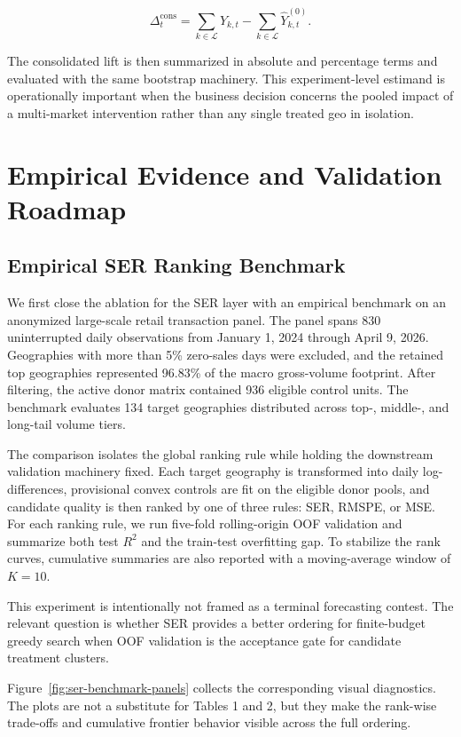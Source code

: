 \documentclass[11pt]{article}
\begin{document}
\[
\Delta_t^{\mathrm{cons}} = \sum_{k \in \mathcal{L}} Y_{k,t} - \sum_{k \in \mathcal{L}} \hat{Y}_{k,t}^{(0)}.
\]

The consolidated lift is then summarized in absolute and percentage terms and evaluated with the same bootstrap machinery. This experiment-level estimand is operationally important when the business decision concerns the pooled impact of a multi-market intervention rather than any single treated geo in isolation.

\section{Empirical Evidence and Validation Roadmap}
\subsection{Empirical SER Ranking Benchmark}
We first close the ablation for the SER layer with an empirical benchmark on an anonymized large-scale retail transaction panel. The panel spans 830 uninterrupted daily observations from January 1, 2024 through April 9, 2026. Geographies with more than 5\% zero-sales days were excluded, and the retained top geographies represented 96.83\% of the macro gross-volume footprint. After filtering, the active donor matrix contained 936 eligible control units. The benchmark evaluates 134 target geographies distributed across top-, middle-, and long-tail volume tiers.

The comparison isolates the global ranking rule while holding the downstream validation machinery fixed. Each target geography is transformed into daily log-differences, provisional convex controls are fit on the eligible donor pools, and candidate quality is then ranked by one of three rules: SER, RMSPE, or MSE. For each ranking rule, we run five-fold rolling-origin OOF validation and summarize both test $R^2$ and the train-test overfitting gap. To stabilize the rank curves, cumulative summaries are also reported with a moving-average window of $K = 10$.

This experiment is intentionally not framed as a terminal forecasting contest. The relevant question is whether SER provides a better ordering for finite-budget greedy search when OOF validation is the acceptance gate for candidate treatment clusters.

Figure~\ref{fig:ser-benchmark-panels} collects the corresponding visual diagnostics. The plots are not a substitute for Tables 1 and 2, but they make the rank-wise trade-offs and cumulative frontier behavior visible across the full ordering.
\end{document}

